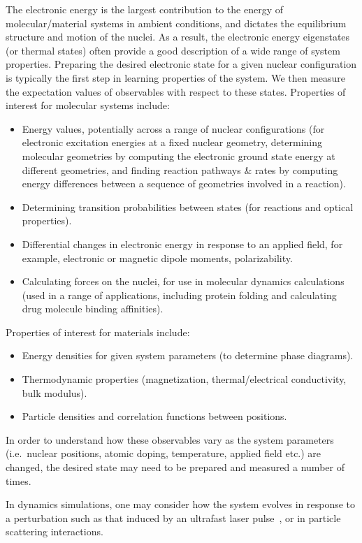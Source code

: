 \begin{refsection}
The electronic energy is the largest contribution to the energy of molecular/material systems in ambient conditions, and dictates the equilibrium structure and motion of the nuclei. As a result, the electronic energy eigenstates (or thermal states) often provide a good description of a wide range of system properties. Preparing the desired electronic state for a given nuclear configuration is typically the first step in learning properties of the system. We then measure the expectation values of observables with respect to these states. Properties of interest for molecular systems include:
\begin{itemize}
    \item Energy values, potentially across a range of nuclear configurations (for electronic excitation energies at a fixed nuclear geometry, determining molecular geometries by computing the electronic ground state energy at different geometries, and finding reaction pathways \& rates by computing energy differences between a sequence of geometries involved in a reaction).
    \item Determining transition probabilities between states (for reactions and optical properties).
    \item Differential changes in electronic energy in response to an applied field, for example, electronic or magnetic dipole moments, polarizability.
    \item Calculating forces on the nuclei, for use in molecular dynamics calculations (used in a range of applications, including protein folding and calculating drug molecule binding affinities).
\end{itemize}
Properties of interest for materials include:
\begin{itemize}
    \item Energy densities for given system parameters (to determine phase diagrams).
    \item Thermodynamic properties (magnetization, thermal/electrical conductivity, bulk modulus).
    \item Particle densities and correlation functions between positions.
\end{itemize}
In order to understand how these observables vary as the system parameters (i.e.~nuclear positions, atomic doping, temperature, applied field etc.) are changed, the desired state may need to be prepared and measured a number of times. 

In dynamics simulations, one may consider how the system evolves in response to a perturbation such as that induced by an ultrafast laser pulse~\cite{kohler1995LaserChemistry,assion1998LaserChemicalReactions,krausz2009AttosecondPhysics}, or in particle scattering interactions.




\end{refsection}
